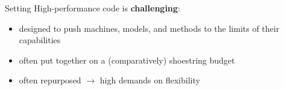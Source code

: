 \documentclass[english,compress]{beamer}
\begin{document}
\begin{frame}{Setting}
  High-performance code is \textbf{challenging}:
  \begin{itemize}
    \item designed to push machines, models, and methods to the limits
      of their capabilities

    \item often put together on a (comparatively) shoestring budget

    \item often repurposed $\rightarrow$ high demands on
    flexibility
  \end{itemize}

\end{frame}
\end{document}
